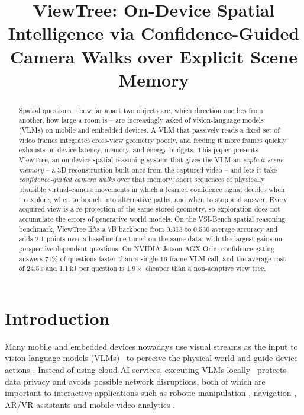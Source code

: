 \documentclass[sigconf,10pt]{acmart}
\newcommand{\system}{ViewTree\xspace}
\begin{document}
	
	\title{ViewTree: On-Device Spatial Intelligence via Confidence-Guided Camera Walks over Explicit Scene Memory}	
	\begin{abstract}
		Spatial questions -- how far apart two objects are, which direction one lies from another, how large a room is -- are increasingly asked of vision-language models (VLMs) on mobile and embedded devices. A VLM that passively reads a fixed set of video frames integrates cross-view geometry poorly, and feeding it more frames quickly exhausts on-device latency, memory, and energy budgets. This paper presents \system, an on-device spatial reasoning system that gives the VLM an \emph{explicit scene memory} -- a 3D reconstruction built once from the captured video -- and lets it take \emph{confidence-guided camera walks} over that memory: short sequences of physically plausible virtual-camera movements in which a learned confidence signal decides when to explore, when to branch into alternative paths, and when to stop and answer. Every acquired view is a re-projection of the same stored geometry, so exploration does not accumulate the errors of generative world models. On the VSI-Bench spatial reasoning benchmark, \system lifts a 7B backbone from 0.313 to 0.530 average accuracy and adds 2.1 points over a baseline fine-tuned on the same data, with the largest gains on perspective-dependent questions. On NVIDIA Jetson AGX Orin, confidence gating answers 71\% of questions faster than a single 16-frame VLM call, and the average cost of 24.5\,s and 1.1\,kJ per question is $1.9\times$ cheaper than a non-adaptive view tree.
	\end{abstract}
	
	\maketitle
	\pagestyle{plain}
	
\section{Introduction}
	Many mobile and embedded devices nowadays use visual streams as the input to vision-language models (VLMs)~\cite{achiam2023gpt4,llava2023,bai2025qwen2} to perceive the physical world and guide device actions \cite{driess2023palme,openeqa2024}. Instead of using cloud AI services, executing VLMs locally~\cite{mobilevlm2023,minicpmv2024,awq2024} protects data privacy and avoids possible network disruptions, both of which are important to interactive applications such as robotic manipulation \cite{brohan2023rt2,kim2024openvla,black2024pi0}, navigation \cite{anderson2018vln,navid2024,simon2023mononav}, AR/VR assistants \cite{apicharttrisorn2019frugal,liu2019edge} and mobile video analytics \cite{wang2025empowering}. 
	
\end{document}
